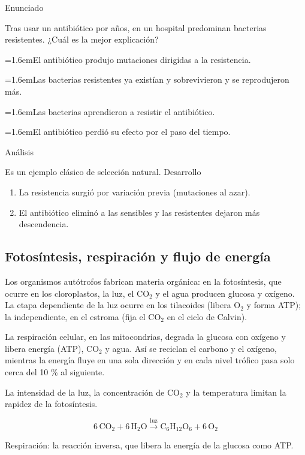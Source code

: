 \documentclass[10pt,a4paper,twocolumn]{article}
\newcommand{\alternativa}[2]{\par\noindent\hangindent=1.6em\hangafter=1\makebox[1.6em][l]{\tecla{#1}}#2\par}
\newcommand{\clave}[1]{\par\smallskip{\sffamily\footnotesize\color{esmeralda} Clave \teclaok{#1}}\par}
\begin{document}
\begin{ejemplo}
{\sffamily\footnotesize\color{zinc500} Enunciado}\par
Tras usar un antibiótico por años, en un hospital predominan bacterias resistentes. ¿Cuál es la mejor explicación?
\alternativa{A}{El antibiótico produjo mutaciones dirigidas a la resistencia.}
\alternativa{B}{Las bacterias resistentes ya existían y sobrevivieron y se reprodujeron más.}
\alternativa{C}{Las bacterias aprendieron a resistir el antibiótico.}
\alternativa{D}{El antibiótico perdió su efecto por el paso del tiempo.}
\clave{B}
{\sffamily\footnotesize\color{zinc500} Análisis}\par Es un ejemplo clásico de selección natural.
{\sffamily\footnotesize\color{zinc500} Desarrollo}
\begin{enumerate}
  \item La resistencia surgió por variación previa (mutaciones al azar).
  \item El antibiótico eliminó a las sensibles y las resistentes dejaron más descendencia.
\end{enumerate}
\end{ejemplo}

\subsection{Fotosíntesis, respiración y flujo de energía}

Los organismos autótrofos fabrican materia orgánica: en la fotosíntesis, que ocurre en los cloroplastos, la luz, el $\mathrm{CO_2}$ y el agua producen glucosa y oxígeno. La etapa dependiente de la luz ocurre en los tilacoides (libera $\mathrm{O_2}$ y forma ATP); la independiente, en el estroma (fija el $\mathrm{CO_2}$ en el ciclo de Calvin).

La respiración celular, en las mitocondrias, degrada la glucosa con oxígeno y libera energía (ATP), $\mathrm{CO_2}$ y agua. Así se reciclan el carbono y el oxígeno, mientras la energía fluye en una sola dirección y en cada nivel trófico pasa solo cerca del 10 \% al siguiente.

La intensidad de la luz, la concentración de $\mathrm{CO_2}$ y la temperatura limitan la rapidez de la fotosíntesis.

\begin{mecanismo}
\[6\,\mathrm{CO_2}+6\,\mathrm{H_2O}\xrightarrow{\text{luz}}\mathrm{C_6H_{12}O_6}+6\,\mathrm{O_2}\]

Respiración: la reacción inversa, que libera la energía de la glucosa como ATP.
\end{mecanismo}
\end{document}
